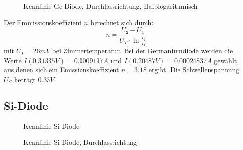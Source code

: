 \documentclass[a4paper]{article}
\begin{document}
\begin{figure}[H]
    \centering
    \caption{Kennlinie Ge-Diode, Durchlassrichtung, Halblogarithmisch}
    \label{fig:kennlinie-ge-durchlass-hlog}
\end{figure}

Der Emmissionskoeffizient $n$ berechnet sich durch:
\begin{equation*}
    n =\frac{U_2 - U_1}{U_T \cdot \ln{\frac{I_2}{I_1}}}
\end{equation*}
mit $U_T = 26\si{mV}$ bei Zimmertemperatur. Bei der Germaniumdiode werden die Werte $I(0.31335\si{V})=0.0009197\si{A}$ und $I(0.20487\si{V})=0.00024837\si{A}$ gewählt, aus denen sich ein Emissionskoeffizient $n=3.18$ ergibt.
Die Schwellenspannung $U_S$ beträgt $0.33\si{V}$.

\subsection{Si-Diode}

\begin{figure}[H]
    \centering
    \caption{Kennlinie Si-Diode}
    \label{fig:kennlinie-si}
\end{figure}

\begin{figure}[H]
    \centering
    \caption{Kennlinie Si-Diode, Durchlassrichtung}
    \label{fig:kennlinie-si-durchlass}
\end{figure}
\end{document}

